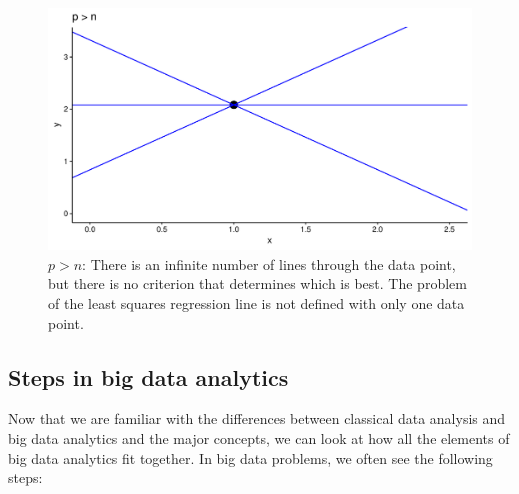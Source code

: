 \documentclass[]{book}\usepackage[]{graphicx}\usepackage[]{color}
\makeatletter
\def\maxwidth{ %
  \ifdim\Gin@nat@width>\linewidth
    \linewidth
  \else
    \Gin@nat@width
  \fi
}
\newenvironment{knitrout}{}{} %
\makeatother
\begin{document}
\begin{knitrout}
\color{fgcolor}\begin{figure}
\includegraphics[width=\maxwidth]{figure/n1-1} \caption[$p > n$]{$p > n$: There is an infinite number of lines through the data point, but there is no criterion that determines which is best. The problem of the least squares regression line is not defined with only one data point.}\label{fig:n1}
\end{figure}


\end{knitrout}


\subsection{Steps in big data analytics}

Now that we are familiar with the differences between classical data analysis and big data analytics and the major concepts, we can look at how all the elements of big data analytics fit together. In big data problems, we often see the following steps: 
\end{document}
